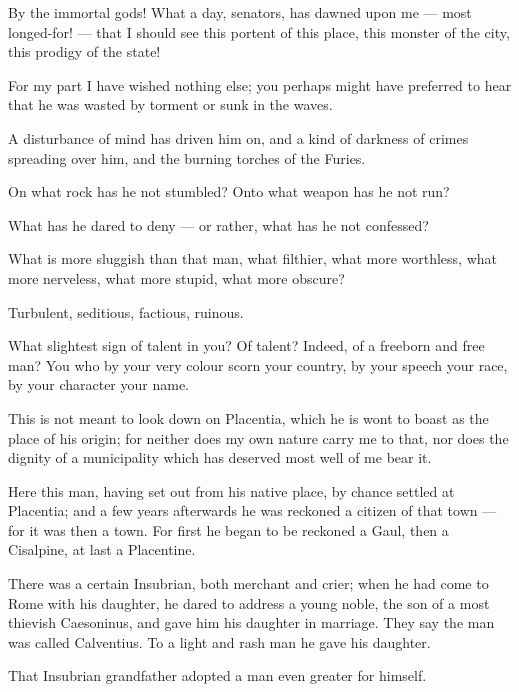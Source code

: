 
 By the immortal gods! What a day, senators, has dawned upon me — most longed-for! — that I should see this portent of this place, this monster of the city, this prodigy of the state!

 For my part I have wished nothing else; you perhaps might have preferred to hear that he was wasted by torment or sunk in the waves.

 A disturbance of mind has driven him on, and a kind of darkness of crimes spreading over him, and the burning torches of the Furies.

 On what rock has he not stumbled? Onto what weapon has he not run?

 What has he dared to deny — or rather, what has he not confessed?

 What is more sluggish than that man, what filthier, what more worthless, what more nerveless, what more stupid, what more obscure?

 Turbulent, seditious, factious, ruinous.

 What slightest sign of talent in you? Of talent? Indeed, of a freeborn and free man? You who by your very colour scorn your country, by your speech your race, by your character your name.

 This is not meant to look down on Placentia, which he is wont to boast as the place of his origin; for neither does my own nature carry me to that, nor does the dignity of a municipality which has deserved most well of me bear it.

 Here this man, having set out from his native place, by chance settled at Placentia; and a few years afterwards he was reckoned a citizen of that town — for it was then a town. For first he began to be reckoned a Gaul, then a Cisalpine, at last a Placentine.

 There was a certain Insubrian, both merchant and crier; when he had come to Rome with his daughter, he dared to address a young noble, the son of a most thievish Caesoninus, and gave him his daughter in marriage. They say the man was called Calventius. To a light and rash man he gave his daughter.

 That Insubrian grandfather adopted a man even greater for himself.

